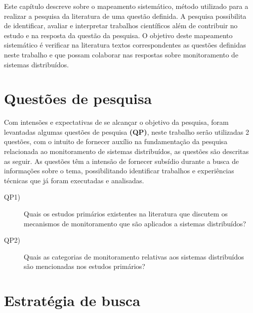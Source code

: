 \label{mapeamento_sistematico}

Este capítulo descreve sobre o mapeamento sistemático, método utilizado para a realizar a pesquisa da literatura de uma questão definida. A pesquisa possibilita de identificar, avaliar e interpretar trabalhos científicos além de contribuir no estudo e na resposta da questão da pesquisa\cite{kitchenham2007guidelines,petticrew2008systematic,de2018mapeamento}. O objetivo deste mapeamento sistemático é verificar na literatura textos correspondentes as questões definidas neste trabalho e que possam colaborar nas respostas sobre monitoramento de sistemas distribuídos.


\section{Questões de pesquisa}

Com intensões e expectativas de se alcançar o objetivo da pesquisa, foram levantadas algumas questões de pesquisa \textbf{(QP)}, neste trabalho serão utilizadas 2 questões, com o intuito de fornecer auxílio na fundamentação da pesquisa relacionada ao monitoramento de sistemas distribuídos, as questões são descritas as seguir. As questões têm a intensão de fornecer subsídio durante a busca de informações sobre o tema, possibilitando identificar trabalhos e experiências técnicas que já foram executadas e analisadas\cite{feltrim2004abordagem}.

\begin{description}
\item[QP1)] Quais os estudos primários existentes na literatura que discutem os mecanismos de monitoramento 
que são aplicados a sistemas distribuídos?
\item[QP2)] Quais as categorias de monitoramento relativas aos sistemas distribuídos são mencionadas nos estudos primários?
\end{description}


\section{Estratégia de busca}
\label{sec:stringbusca}

